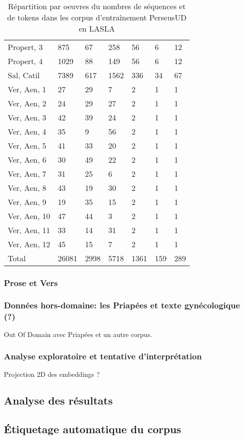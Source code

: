 \begin{table}[]
\begin{tabular}{l|lll|lll}
 Propert, 3   & 875    & 67   & 258  & 56     & 6   & 12   \\
 Propert, 4   & 1029   & 88   & 149  & 56     & 6   & 12   \\
 Sal, Catil   & 7389   & 617  & 1562 & 336    & 34  & 67   \\
 Ver, Aen, 1  & 27     & 29   & 7    & 2      & 1   & 1    \\
 Ver, Aen, 2  & 24     & 29   & 27   & 2      & 1   & 1    \\
 Ver, Aen, 3  & 42     & 39   & 24   & 2      & 1   & 1    \\
 Ver, Aen, 4  & 35     & 9    & 56   & 2      & 1   & 1    \\
 Ver, Aen, 5  & 41     & 33   & 20   & 2      & 1   & 1    \\
 Ver, Aen, 6  & 30     & 49   & 22   & 2      & 1   & 1    \\
 Ver, Aen, 7  & 31     & 25   & 6    & 2      & 1   & 1    \\
 Ver, Aen, 8  & 43     & 19   & 30   & 2      & 1   & 1    \\
 Ver, Aen, 9  & 19     & 35   & 15   & 2      & 1   & 1    \\
 Ver, Aen, 10 & 47     & 44   & 3    & 2      & 1   & 1    \\
 Ver, Aen, 11 & 33     & 14   & 31   & 2      & 1   & 1    \\
 Ver, Aen, 12 & 45     & 15   & 7    & 2      & 1   & 1    \\ \midrule
 Total        & 26081  & 2998 & 5718 & 1361   & 159 & 289  \\ \bottomrule
\hline
\end{tabular}
\label{table:lasla:perseus-ud}
\caption{Répartition par oeuvres du nombres de séquences et de tokens dans les corpus d'entraînement PerseusUD en LASLA}
\end{table}

\subsubsection{Prose et Vers}
\label{lemmatisation:extensibilite:prose-vers}

\subsubsection{Données hors-domaine: les Priapées et texte gynécologique (?)}

Out Of Domain avec Priapées et un autre corpus.


\subsubsection{Analyse exploratoire et tentative d'interprétation}

Projection 2D des embeddings ?


\subsection{Analyse des résultats}
\label{subsec:lemma_resultats}


\subsection{Étiquetage automatique du corpus}